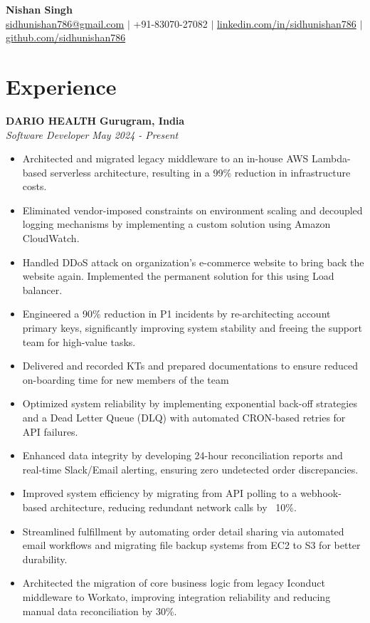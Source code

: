 \documentclass[10pt, letterpaper]{article}
\newcommand{\resumeEntry}[4]{
  \noindent\textbf{#1} \hfill \textbf{#2} \\
  \textit{#3} \hfill \textit{#4}
}
\begin{document}
\begin{center}
    {\huge \textbf{Nishan Singh}} \\[5pt]
    {\small 
    \href{mailto:sidhunishan786@gmail.com}{sidhunishan786@gmail.com} $|$ 
    +91-83070-27082 $|$ 
    \href{https://www.linkedin.com/in/sidhunishan786/}{linkedin.com/in/sidhunishan786} $|$ 
    \href{https://github.com/sidhunishan786/}{github.com/sidhunishan786}
    }
\end{center}


\section{Experience}

\resumeEntry{DARIO HEALTH}{Gurugram, India}{Software Developer}{May 2024 - Present}
\begin{itemize}[leftmargin=0.2in, nosep, topsep=2pt]
    \item Architected and migrated legacy middleware to an in-house AWS Lambda-based serverless architecture, resulting in a 99\% reduction in infrastructure costs.
    \item Eliminated vendor-imposed constraints on environment scaling and decoupled logging mechanisms by implementing a custom solution using Amazon CloudWatch.
    \item Handled DDoS attack on organization’s e-commerce website to bring back the website again. Implemented the permanent solution for this using Load balancer.
    \item Engineered a 90\% reduction in P1 incidents by re-architecting account primary keys, significantly improving system stability and freeing the support team for high-value tasks.
    \item Delivered and recorded KTs and prepared documentations  to ensure reduced on-boarding time for new members of the team
    \item Optimized system reliability by implementing exponential back-off strategies and a Dead Letter Queue (DLQ) with automated CRON-based retries for API failures.
    \item Enhanced data integrity by developing 24-hour reconciliation reports and real-time Slack/Email alerting, ensuring zero undetected order discrepancies.
    \item Improved system efficiency by migrating from API polling to a webhook-based architecture, reducing redundant network calls by ~10\%.
    \item Streamlined fulfillment by automating order detail sharing via automated email workflows and migrating file backup systems from EC2 to S3 for better durability.
    \item Architected the migration of core business logic from legacy Iconduct middleware to Workato, improving integration reliability and reducing manual data reconciliation by 30\%.
\end{itemize}
\vspace{2pt}
\end{document}

